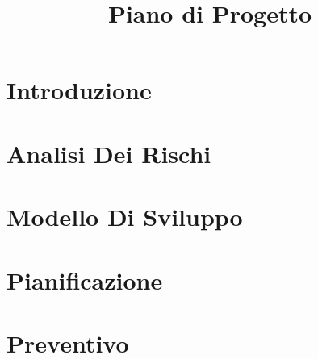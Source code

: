 \documentclass{classes/base}
\title{Piano di Progetto}
\author{\ruth}
\begin{document}
	\maketitle
	\newpage
	\tableofcontents
	\newpage
	\section{Introduzione}
	
	
    \newpage
	\section{Analisi Dei Rischi}
	
	\newpage

	\section{Modello Di Sviluppo}
	

	\newpage
	\section{Pianificazione}
	

	\newpage
	\section{Preventivo}
	
	
\end{document}
